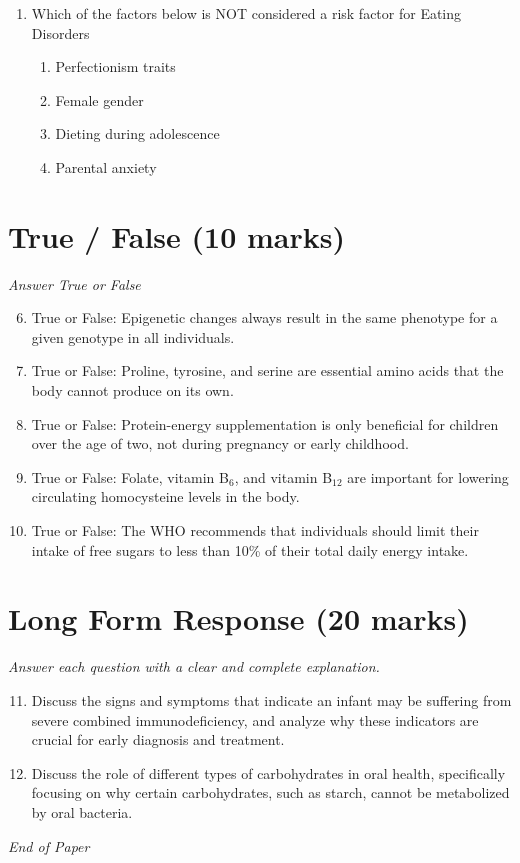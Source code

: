 \documentclass[12pt]{article}
\begin{document}
\begin{enumerate}[label=\arabic*.]
\begin{enumerate}[label=(\alph*)]
    \item Consumption estimates give higher values than those derived from other types of surveys
    \item No information is available on the distribution of consumption within a country
    \item All of the options given are correct
\end{enumerate}
\item Which of the factors below is NOT considered a risk factor for Eating Disorders
\begin{enumerate}[label=(\alph*)]
    \item Perfectionism traits
    \item Female gender
    \item Dieting during adolescence
    \item Parental anxiety
\end{enumerate}
\end{enumerate}

\section*{True / False (10 marks)}
\textit{Answer True or False}
\begin{enumerate}[label=\arabic*.]
\setcounter{enumi}{5}
\item True or False: Epigenetic changes always result in the same phenotype for a given genotype in all individuals.
\item True or False: Proline, tyrosine, and serine are essential amino acids that the body cannot produce on its own.
\item True or False: Protein-energy supplementation is only beneficial for children over the age of two, not during pregnancy or early childhood.
\item True or False: Folate, vitamin B$_{6}$, and vitamin B$_{12}$ are important for lowering circulating homocysteine levels in the body.
\item True or False: The WHO recommends that individuals should limit their intake of free sugars to less than 10\% of their total daily energy intake.
\end{enumerate}

\section*{Long Form Response (20 marks)}
\textit{Answer each question with a clear and complete explanation.}
\begin{enumerate}[label=\arabic*.]
\setcounter{enumi}{10}
\item Discuss the signs and symptoms that indicate an infant may be suffering from severe combined immunodeficiency, and analyze why these indicators are crucial for early diagnosis and treatment.
\item Discuss the role of different types of carbohydrates in oral health, specifically focusing on why certain carbohydrates, such as starch, cannot be metabolized by oral bacteria.
\end{enumerate}

\vfill
\noindent\textit{End of Paper}
\end{document}
